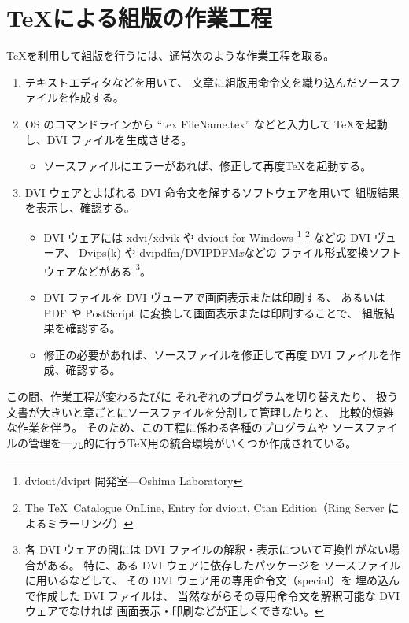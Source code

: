 \documentclass{jsarticle}
\def\DVIPDFMx{DVIPDFM{\itshape x}}
\begin{document}
\section{\TeX による組版の作業工程}

\TeX を利用して組版を行うには、通常次のような作業工程を取る。
\begin{enumerate}
\item 
テキストエディタなどを用いて、
文章に組版用命令文を織り込んだソースファイルを作成する。

\item 
OS のコマンドラインから 
``tex FileName.tex'' などと入力して
\TeX を起動し、DVI ファイルを生成させる。
\begin{itemize}
\item
ソースファイルにエラーがあれば、修正して再度\TeX を起動する。
\end{itemize}

\item 
DVI ウェアとよばれる DVI 命令文を解するソフトウェアを用いて
組版結果を表示し、確認する。
\begin{itemize}
\item 
DVI ウェアには xdvi/xdvik や 
dviout for Windows%
\footnote{dviout/dviprt 開発室---Oshima Laboratory}%
\footnote{The \TeX\ Catalogue OnLine, Entry for dviout, 
Ctan Edition（Ring Server によるミラーリング）}%
などの DVI ヴューア、
Dvips(k) や dvipdfm/\DVIPDFMx などの
ファイル形式変換ソフトウェアなどがある%
\footnote{各 DVI ウェアの間には
DVI ファイルの解釈・表示について互換性がない場合がある。
特に、ある DVI ウェアに依存したパッケージを
ソースファイルに用いるなどして、
その DVI ウェア用の専用命令文（special）を
埋め込んで作成した DVI ファイルは、
当然ながらその専用命令文を解釈可能な DVI ウェアでなければ
画面表示・印刷などが正しくできない。}。

\item 
DVI ファイルを DVI ヴューアで画面表示または印刷する、
あるいは PDF や PostScript に変換して画面表示または印刷することで、
組版結果を確認する。

\item 
修正の必要があれば、ソースファイルを修正して再度 DVI ファイルを作成、確認する。
\end{itemize}
\end{enumerate}

この間、作業工程が変わるたびに
それぞれのプログラムを切り替えたり、
扱う文書が大きいと章ごとにソースファイルを分割して管理したりと、
比較的煩雑な作業を伴う。
そのため、この工程に係わる各種のプログラムや
ソースファイルの管理を一元的に行う\TeX 用の統合環境がいくつか作成されている。
\end{document}
